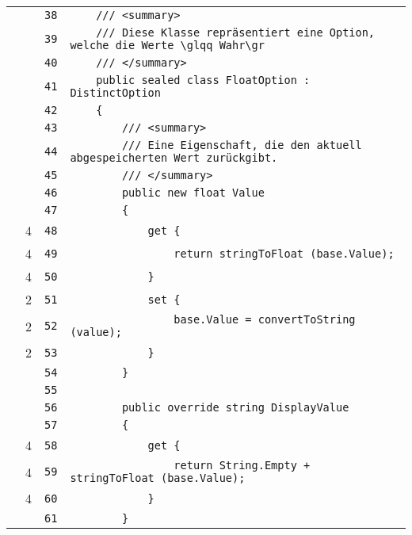 \documentclass[a4paper,10pt]{article}
\begin{document}
\begin{longtable}[l]{lrrl}
\cellcolor{gray} &  & \verb~38~ & \verb~    /// <summary>~\\
\cellcolor{gray} &  & \verb~39~ & \verb~    /// Diese Klasse repräsentiert eine Option, welche die Werte \glqq Wahr\gr~\\
\cellcolor{gray} &  & \verb~40~ & \verb~    /// </summary>~\\
\cellcolor{gray} &  & \verb~41~ & \verb~    public sealed class FloatOption : DistinctOption~\\
\cellcolor{gray} &  & \verb~42~ & \verb~    {~\\
\cellcolor{gray} &  & \verb~43~ & \verb~        /// <summary>~\\
\cellcolor{gray} &  & \verb~44~ & \verb~        /// Eine Eigenschaft, die den aktuell abgespeicherten Wert zurückgibt.~\\
\cellcolor{gray} &  & \verb~45~ & \verb~        /// </summary>~\\
\cellcolor{gray} &  & \verb~46~ & \verb~        public new float Value~\\
\cellcolor{gray} &  & \verb~47~ & \verb~        {~\\
\cellcolor{green} & 4 & \verb~48~ & \verb~            get {~\\
\cellcolor{green} & 4 & \verb~49~ & \verb~                return stringToFloat (base.Value);~\\
\cellcolor{green} & 4 & \verb~50~ & \verb~            }~\\
\cellcolor{green} & 2 & \verb~51~ & \verb~            set {~\\
\cellcolor{green} & 2 & \verb~52~ & \verb~                base.Value = convertToString (value);~\\
\cellcolor{green} & 2 & \verb~53~ & \verb~            }~\\
\cellcolor{gray} &  & \verb~54~ & \verb~        }~\\
\cellcolor{gray} &  & \verb~55~ & \verb~~\\
\cellcolor{gray} &  & \verb~56~ & \verb~        public override string DisplayValue~\\
\cellcolor{gray} &  & \verb~57~ & \verb~        {~\\
\cellcolor{green} & 4 & \verb~58~ & \verb~            get {~\\
\cellcolor{green} & 4 & \verb~59~ & \verb~                return String.Empty + stringToFloat (base.Value);~\\
\cellcolor{green} & 4 & \verb~60~ & \verb~            }~\\
\cellcolor{gray} &  & \verb~61~ & \verb~        }~\\

\end{longtable}
\end{document}

